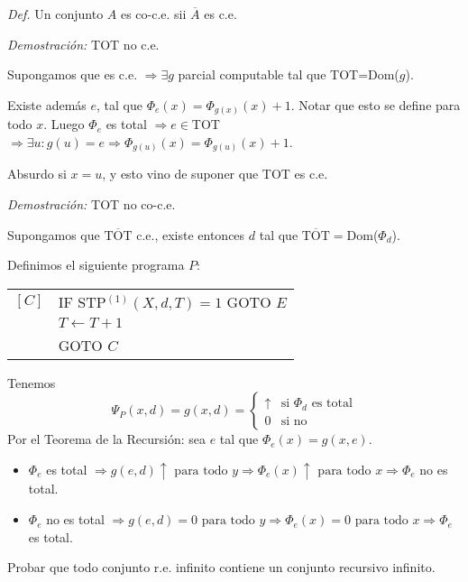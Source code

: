 \begin{questions}
\begin{solution}
 {\it Def. } Un conjunto $A$ es co-c.e. sii $\overline{A}$ es c.e.
 
 {\it Demostraci\'on: } TOT no c.e.
 
 Supongamos que es c.e. $\Rightarrow \exists g$ parcial computable tal que TOT=Dom($g$).
 
 Existe adem\'as $e$, tal que $\Phi_e(x)=\Phi_{g(x)}(x)+1$. Notar que esto se define para todo $x$. Luego $\Phi_e$ es total $\Rightarrow e\in$TOT$\Rightarrow \exists u : g(u)=e \Rightarrow \Phi_{g(u)}(x)=\Phi_{g(u)}(x)+1$. 
 
 Absurdo si $x=u$, y esto vino de suponer que TOT es c.e.
 
 {\it Demostraci\'on: } TOT no co-c.e.
 
 Supongamos que $\overline{\text{TOT}}$ c.e., existe entonces $d$ tal que $\overline{\text{TOT}}=$Dom($\Phi_d$). 
 
 Definimos el siguiente programa $P$: 
 
 \vspace{0.5cm}
  \begin{tabular}{rl}
    $[C]$ & IF STP$^{(1)}(X,d,T)=1$ GOTO $E$ \\
	  & $T\leftarrow T+1$\\
	  & GOTO $C$
  \end{tabular}
 \vspace{0.5cm}
 
 Tenemos
 \begin{equation*}
    \Psi_P(x,d) = g(x,d) = \left\{ \begin{matrix} 
      \uparrow & \text{si } \Phi_d \text{ es total} \\ 
      0 & \text{si no}
    \end{matrix} \right.
  \end{equation*}
 Por el Teorema de la Recursi\'on: sea $e$ tal que $\Phi_e(x)=g(x,e)$. 
 
 \begin{itemize}
  \item $\Phi_e$ es total $\Rightarrow g(e,d)\uparrow\text{ para todo } y \Rightarrow \Phi_e(x)\uparrow \text{ para todo } x\Rightarrow \Phi_e$ no es total.
  \item $\Phi_e$ no es total $\Rightarrow g(e,d)=0 \text{ para todo } y \Rightarrow \Phi_e(x)=0 \text{ para todo } x \Rightarrow \Phi_e$ es total. 
 \end{itemize}

\end{solution}

\question Probar que todo conjunto r.e. infinito contiene un conjunto recursivo infinito. 


\end{questions}
